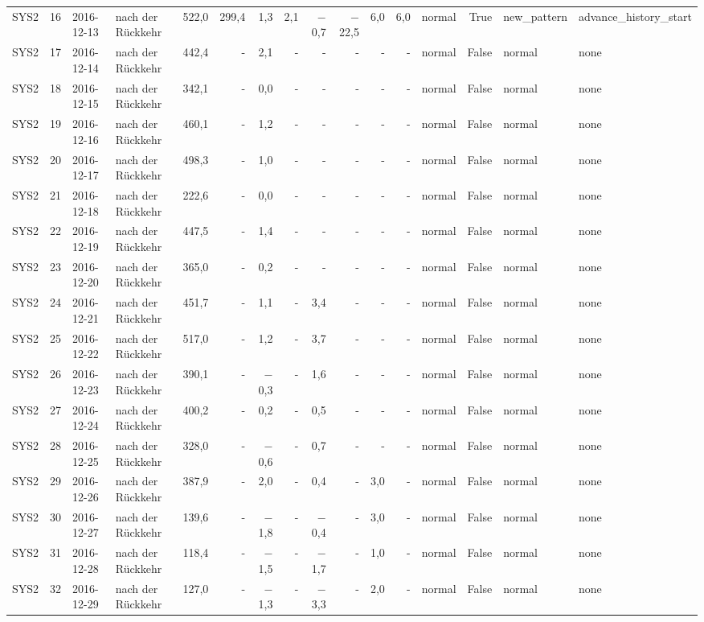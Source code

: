 \begin{tabular}{lrllrrrrrrrrlrll}
SYS2 & 16 & 2016-12-13 & nach der Rückkehr & 522,0 & 299,4 & 1,3 & 2,1 & $-$0,7 & $-$22,5 & 6,0 & 6,0 & normal & True & new\_pattern & advance\_history\_start \\
SYS2 & 17 & 2016-12-14 & nach der Rückkehr & 442,4 & - & 2,1 & - & - & - & - & - & normal & False & normal & none \\
SYS2 & 18 & 2016-12-15 & nach der Rückkehr & 342,1 & - & 0,0 & - & - & - & - & - & normal & False & normal & none \\
SYS2 & 19 & 2016-12-16 & nach der Rückkehr & 460,1 & - & 1,2 & - & - & - & - & - & normal & False & normal & none \\
SYS2 & 20 & 2016-12-17 & nach der Rückkehr & 498,3 & - & 1,0 & - & - & - & - & - & normal & False & normal & none \\
SYS2 & 21 & 2016-12-18 & nach der Rückkehr & 222,6 & - & 0,0 & - & - & - & - & - & normal & False & normal & none \\
SYS2 & 22 & 2016-12-19 & nach der Rückkehr & 447,5 & - & 1,4 & - & - & - & - & - & normal & False & normal & none \\
SYS2 & 23 & 2016-12-20 & nach der Rückkehr & 365,0 & - & 0,2 & - & - & - & - & - & normal & False & normal & none \\
SYS2 & 24 & 2016-12-21 & nach der Rückkehr & 451,7 & - & 1,1 & - & 3,4 & - & - & - & normal & False & normal & none \\
SYS2 & 25 & 2016-12-22 & nach der Rückkehr & 517,0 & - & 1,2 & - & 3,7 & - & - & - & normal & False & normal & none \\
SYS2 & 26 & 2016-12-23 & nach der Rückkehr & 390,1 & - & $-$0,3 & - & 1,6 & - & - & - & normal & False & normal & none \\
SYS2 & 27 & 2016-12-24 & nach der Rückkehr & 400,2 & - & 0,2 & - & 0,5 & - & - & - & normal & False & normal & none \\
SYS2 & 28 & 2016-12-25 & nach der Rückkehr & 328,0 & - & $-$0,6 & - & 0,7 & - & - & - & normal & False & normal & none \\
SYS2 & 29 & 2016-12-26 & nach der Rückkehr & 387,9 & - & 2,0 & - & 0,4 & - & 3,0 & - & normal & False & normal & none \\
SYS2 & 30 & 2016-12-27 & nach der Rückkehr & 139,6 & - & $-$1,8 & - & $-$0,4 & - & 3,0 & - & normal & False & normal & none \\
SYS2 & 31 & 2016-12-28 & nach der Rückkehr & 118,4 & - & $-$1,5 & - & $-$1,7 & - & 1,0 & - & normal & False & normal & none \\
SYS2 & 32 & 2016-12-29 & nach der Rückkehr & 127,0 & - & $-$1,3 & - & $-$3,3 & - & 2,0 & - & normal & False & normal & none \\

\end{tabular}

